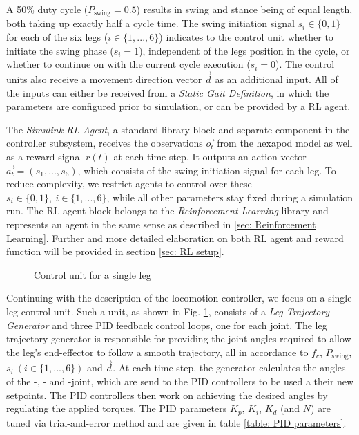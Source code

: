 A 50\% duty cycle ($P_{\text{swing}} = 0.5$) results in swing and stance being of equal length, both taking up exactly half a cycle time.
The swing initiation signal $s_i \in \{0,1\}$ for each of the six legs ($i \in \{1,...,6\}$) indicates to the control unit whether to initiate the swing phase ($s_i = 1$), independent of the legs position in the cycle, or whether to continue on with the current cycle execution ($s_i = 0$).
The control units also receive a movement direction vector $\vec{d}$ as an additional input.
All of the inputs can either be received from a \textit{Static Gait Definition}, in which the parameters are configured prior to simulation, or can be provided by a RL agent.

The \textit{Simulink RL Agent}, a standard library block and separate component in the controller subsystem, receives the observations $\vec{o_t}$ from the hexapod model as well as a reward signal $r(t)$ at each time step.
It outputs an action vector $\vec{a_t} = (s_1,...,s_6)$, which consists of the swing initiation signal for each leg.
To reduce complexity, we restrict agents to control over these $s_i \in \{0,1\},\ i \in \{1,...,6\}$, while all other parameters stay fixed during a simulation run.
The RL agent block belongs to the \textit{Reinforcement Learning} library and represents an agent in the same sense as described in \ref{sec: Reinforcement Learning}.
Further and more detailed elaboration on both RL agent and reward function will be provided in section \ref{sec: RL setup}.

\begin{figure}
	\centerline{}
	\caption[Single leg control unit]{Control unit for a single leg}
	\label{figure: Leg control unit}
\end{figure}

Continuing  with the description of the locomotion controller, we focus on a single leg control unit.
Such a unit, as shown in Fig. \ref{figure: Leg control unit}, consists of a \textit{Leg Trajectory Generator} and three PID feedback control loops, one for each joint.
The leg trajectory generator is responsible for providing the joint angles required to allow the leg's end-effector to follow a smooth trajectory, all in accordance to $f_c$, $P_\text{swing}$, $s_i\ (i \in \{1,...,6\})$ and $\vec{d}$.
At each time step, the generator calculates the angles of the \textalpha-, \textbeta- and \textgamma-joint, which are send to the PID controllers to be used a their new setpoints.
The PID controllers then work on achieving the desired angles by regulating the applied torques.
The PID parameters $K_p$, $K_i$, $K_d$ (and $N$) are tuned via trial-and-error method and are given in table \ref{table: PID parameters}.

